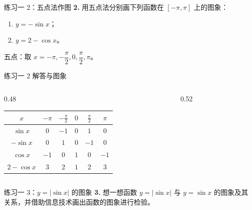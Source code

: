 \documentclass[10pt,aspectratio=169,serif]{beamer}
\begin{document}
\begin{frame}[t]{练习一 2：五点法作图}
\textbf{2.} 用五点法分别画下列函数在 $[-\pi,\pi]$ 上的图象：
\begin{enumerate}[(1)]
  \item $y=-\sin x$； \qquad
  \item $y=2-\cos x$。
\end{enumerate}
\vspace{0.5em}
\small 五点：取 $x=-\pi,-\dfrac{\pi}{2},0,\dfrac{\pi}{2},\pi$。
\end{frame}

\begin{frame}[t]{练习一 2 解答与图象}
\begin{columns}
\begin{column}{0.48\textwidth}
\small
\begin{tabular}{c|ccccc}
$x$ & $-\pi$ & $-\frac\pi2$ & $0$ & $\frac\pi2$ & $\pi$\\
\hline
$\sin x$ & $0$ & $-1$ & $0$ & $1$ & $0$\\
$-\sin x$ & $0$ & $1$ & $0$ & $-1$ & $0$\\
\hline
$\cos x$ & $-1$ & $0$ & $1$ & $0$ & $-1$\\
$2-\cos x$ & $3$ & $2$ & $1$ & $2$ & $3$\\
\end{tabular}
\end{column}
\begin{column}{0.52\textwidth}
\end{column}
\end{columns}
\end{frame}

\begin{frame}[t]{练习一 3：$y=|\sin x|$ 的图象}
\textbf{3.} 想一想函数 $y=|\sin x|$ 与 $y=\sin x$ 的图象及其关系，并借助信息技术画出函数的图象进行检验。
\end{frame}
\end{document}
